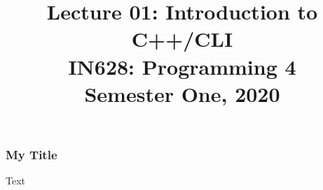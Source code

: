 \documentclass[10pt]{beamer}
\author{}
\title{Lecture 01: Introduction to C++/CLI\\IN628: Programming 4\\Semester One, 2020}
\institute{Otago Polytechnic, Dunedin, New Zealand}
\date{}
\begin{document}
\begin{frame}
	\titlepage
\end{frame}

\begin{frame}
	\frametitle{My Title} 
	Text
\end{frame}
  
\end{document}
